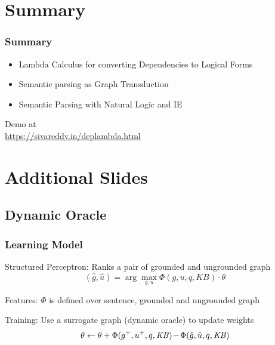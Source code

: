 \documentclass[mathserif,12pt]{beamer}
\newcommand{\hlight}[1]{{\color{blue!80} #1}}
\begin{document}
\section{Summary}
\begin{frame}
\frametitle{Summary}
\begin{itemize}
 \item Lambda Calculus for converting Dependencies to Logical Forms
 
 \vspace{1em} 
 \item Semantic parsing as Graph Transduction

 \vspace{1em}
 \item Semantic Parsing with Natural Logic and IE
\end{itemize}

\pause
\begin{center}Demo at\\ \hlight{\url{https://sivareddy.in/deplambda.html}} \\
\end{center}
\end{frame}

\section{Additional Slides}

\subsection{Dynamic Oracle}
\begin{frame}[noframenumbering]
\frametitle{Learning Model}

\hlight{Structured Perceptron:} Ranks a pair of
grounded and ungrounded graph $$(\hat{g},\hat{u}) = \arg\max\limits_{g,u}
                        \Phi(g,u,q,\mathit{KB}) \cdot \theta$$

\pause

\vspace{0.5cm}
\hlight{Features:} $\Phi$ is defined over sentence, grounded and
ungrounded graph

\vspace{1cm}

\pause
\hlight{Training:} Use a surrogate graph (dynamic oracle) to update weights 
$$\theta \leftarrow \theta +
\Phi(g^+,u^+,q,\mathit{KB})\hspace{-.3ex}-\hspace{-.3ex}\Phi(\hat{g},\hat{u},q,\mathit{KB})$$


\end{frame}
\end{document}
